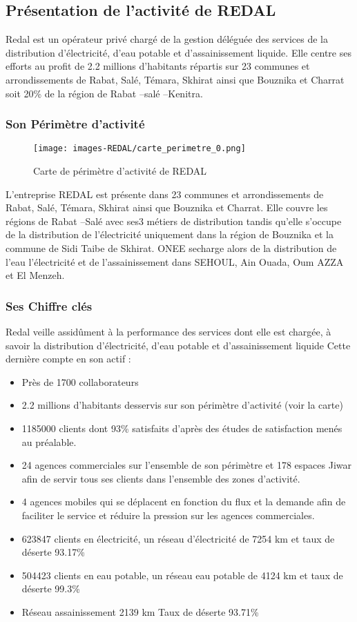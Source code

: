 \subsection{Présentation de l’activité de REDAL}
Redal est un opérateur privé chargé de la gestion déléguée des services de la distribution 
d’électricité, d’eau potable et d’assainissement liquide. Elle centre ses efforts au profit de 2.2 
millions d’habitants répartis sur 23 communes et arrondissements de Rabat, Salé, Témara, 
Skhirat ainsi que Bouznika et Charrat soit 20\% de la région de Rabat –salé –Kenitra.
\subsubsection{Son Périmètre d’activité}
\medskip
\begin{figure}[!h]
    \centering
    \texttt{[image: images-REDAL/carte\_perimetre\_0.png]}
    \caption{Carte de périmètre d'activité de REDAL}
    \label{fig:2}
\end{figure}
L’entreprise REDAL est présente dans 23 communes et arrondissements de Rabat, Salé, 
Témara, Skhirat ainsi que Bouznika et Charrat. Elle couvre les régions de Rabat –Salé avec 
ses3 métiers de distribution tandis qu’elle s’occupe de la distribution de l’électricité 
uniquement dans la région de Bouznika et la commune de Sidi Taibe de Skhirat. ONEE secharge alors de la distribution de l’eau l’électricité et de l’assainissement dans SEHOUL, Ain 
Ouada, Oum AZZA et El Menzeh.

\subsubsection{Ses Chiffre clés}
Redal veille assidûment à la performance des services dont elle est chargée, à savoir la 
distribution d’électricité, d’eau potable et d’assainissement liquide
Cette dernière compte en son actif :
\begin{itemize}
    \item Près de 1700 collaborateurs 
    \item  2.2 millions d’habitants desservis sur son périmètre d’activité (voir la carte) 
    \item 1185000 clients dont 93\% satisfaits d’après des études de satisfaction menés au 
préalable. 
    \item 24 agences commerciales sur l’ensemble de son périmètre et 178 espaces Jiwar afin de 
servir tous ses clients dans l’ensemble des zones d’activité. 
    \item 4 agences mobiles qui se déplacent en fonction du flux et la demande afin de faciliter le service et réduire la pression sur les agences commerciales. 
    \item 623847 clients en électricité, un réseau d’électricité de 7254 km et taux de déserte 
   93.17\% 
   \item  504423 clients en eau potable, un réseau eau potable de 4124 km et taux de déserte 99.3\% 
   \item Réseau assainissement 2139 km Taux de déserte 93.71\% 
\end{itemize}

